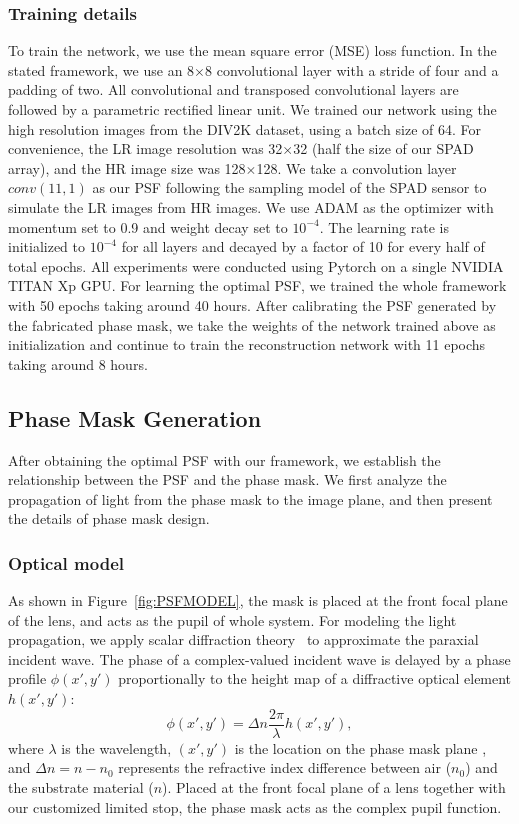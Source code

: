  \subsubsection{Training details}
 To train the network, we use the mean square error (MSE) loss
 function.  In the stated framework, we use an 8$\times$8
 convolutional layer with a stride of four and a padding of two. All
 convolutional and transposed convolutional layers are followed by a
 parametric rectified linear unit. We trained our network using the
 high resolution images from the DIV2K dataset, using a batch size of
 64. For convenience, the LR image resolution was 32$\times$32 (half
 the size of our SPAD array), and the HR image size was
 128$\times$128.  We take a convolution layer $conv(11,1)$ as our PSF
 following the sampling model of the SPAD sensor to simulate the LR
 images from HR images.  We use ADAM as the optimizer with momentum
 set to 0.9 and weight decay set to $10^{-4}$.  The learning rate is
 initialized to $10^{-4}$ for all layers and decayed by a factor of 10
 for every half of total epochs. All experiments were conducted using
 Pytorch on a single NVIDIA TITAN Xp GPU. For learning the optimal
 PSF, we trained the whole framework with 50 epochs taking around 40
 hours. After calibrating the PSF generated by the fabricated phase
 mask, we take the weights of the network trained above as
 initialization and continue to train the reconstruction network with
 11 epochs taking around 8 hours.



\subsection{Phase Mask Generation}
\label{sec:maskgen}
After obtaining the optimal PSF with our framework, we establish
the relationship between the PSF and the phase mask. We first
analyze the propagation of light from the phase mask to the image
plane,  and then present the details of phase mask design. 

\subsubsection{Optical model}
As shown in Figure~\ref{fig:PSFMODEL}, the mask is placed at
the front focal plane of the lens, and acts as the pupil of whole
system.
For modeling the light propagation, we apply scalar diffraction
theory~\cite{goodman2005introduction} to approximate the paraxial
incident wave.  The phase of a complex-valued incident wave is delayed
by a phase profile $\phi(x',y')$ proportionally to the height map of a
diffractive optical element $h(x',y')$:
\begin{equation}\label{eq:phase_height}
\phi(x',y') = \Delta n \frac{2\pi}{\lambda} h(x',y'),
\end{equation}
where $\lambda$ is the wavelength, $(x', y')$ is the location on the
phase mask plane , and $\Delta n = n-n_0$ represents the refractive
index difference between air ($n_0$) and the substrate material
($n$). Placed at the front focal plane of a lens together with our
customized limited stop, the phase mask acts as the complex pupil
function.

